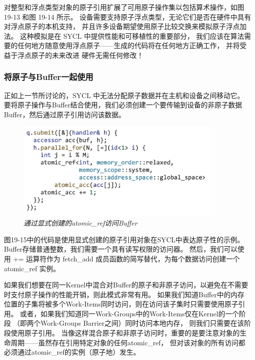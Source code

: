 对整型和浮点类型对象的原子引用扩展了可用原子操作集以包括算术操作，如图 19-13 和图 19-14 所示。 
设备需要支持原子浮点类型，无论它们是否在硬件中具有对浮点原子的本机支持，
并且许多设备期望使用原子比较交换来模拟原子浮点加法。 
这种模拟是在 SYCL 中提供性能和可移植性的重要部分，
我们应该在算法需要的任何地方随意使用浮点原子——生成的代码将在任何地方正确工作，
并将受益于浮点原子的未来改进 硬件无需任何修改！

\subsubsection{将原子与Buffer一起使用}
正如上一节所讨论的，SYCL 中无法分配原子数据并在主机和设备之间移动它。 
要将原子操作与Buffer结合使用，我们必须创建一个要传输到设备的非原子数据Buffer，然后通过原子引用访问该数据。

\begin{figure}[H]
	\centering
	\includegraphics[width=0.9\textwidth]{figs/F19.15.png}
	\caption{\textit{通过显式创建的atomic\_ref访问Buffer }}
\end{figure}

图19-15中的代码是使用显式创建的原子引用对象在SYCL中表达原子性的示例。 
Buffer存储普通整数，我们需要一个具有读写权限的访问器。 
然后，我们可以使用 += 运算符作为 fetch\_add 成员函数的简写替代，为每个数据访问创建一个atomic\_ref 实例。

如果我们想要在同一Kernel中混合对Buffer的原子和非原子访问，以避免在不需要时支付原子操作的性能开销，则此模式非常有用。 
如果我们知道Buffer中的内存位置的子集将被多个Work-Items同时访问，则在访问该子集时只需要使用原子引用。 
或者，如果我们知道同一Work-Groups中的Work-Items仅在Kernel的一个阶段
（即两个Work-Groups Barrier之间）同时访问本地内存，
则我们只需要在该阶段使用原子引用。 
当像这样混合原子和非原子访问时，重要的是要注意对象的生命周期——虽然存在引用特定对象的任何atomic\_ref，
但对该对象的所有访问都必须通过atomic\_ref的实例（原子地）发生。

